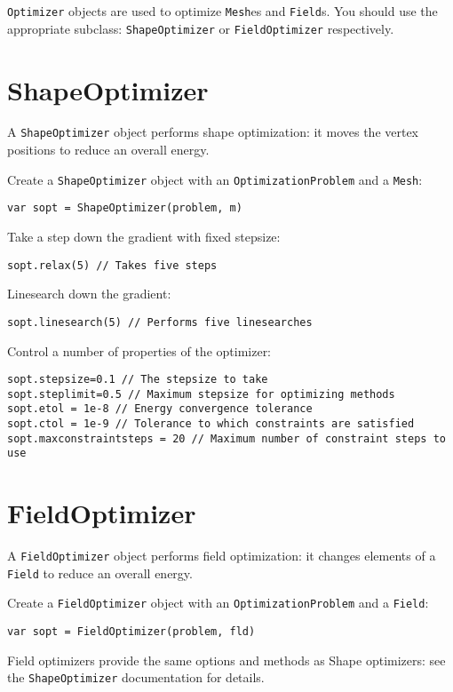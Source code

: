 \texttt{Optimizer} objects are used to optimize \texttt{Mesh}es and
\texttt{Field}s. You should use the appropriate subclass:
\texttt{ShapeOptimizer} or \texttt{FieldOptimizer} respectively.

\hypertarget{shapeoptimizer}{%
\section{ShapeOptimizer}\label{shapeoptimizer}}

A \texttt{ShapeOptimizer} object performs shape optimization: it moves
the vertex positions to reduce an overall energy.

Create a \texttt{ShapeOptimizer} object with an
\texttt{OptimizationProblem} and a \texttt{Mesh}:

\begin{lstlisting}
var sopt = ShapeOptimizer(problem, m)
\end{lstlisting}

Take a step down the gradient with fixed stepsize:

\begin{lstlisting}
sopt.relax(5) // Takes five steps
\end{lstlisting}

Linesearch down the gradient:

\begin{lstlisting}
sopt.linesearch(5) // Performs five linesearches
\end{lstlisting}

Control a number of properties of the optimizer:

\begin{lstlisting}
sopt.stepsize=0.1 // The stepsize to take
sopt.steplimit=0.5 // Maximum stepsize for optimizing methods
sopt.etol = 1e-8 // Energy convergence tolerance 
sopt.ctol = 1e-9 // Tolerance to which constraints are satisfied
sopt.maxconstraintsteps = 20 // Maximum number of constraint steps to use
\end{lstlisting}

\hypertarget{fieldoptimizer}{%
\section{FieldOptimizer}\label{fieldoptimizer}}

A \texttt{FieldOptimizer} object performs field optimization: it changes
elements of a \texttt{Field} to reduce an overall energy.

Create a \texttt{FieldOptimizer} object with an
\texttt{OptimizationProblem} and a \texttt{Field}:

\begin{lstlisting}
var sopt = FieldOptimizer(problem, fld)
\end{lstlisting}

Field optimizers provide the same options and methods as Shape
optimizers: see the \texttt{ShapeOptimizer} documentation for details.
